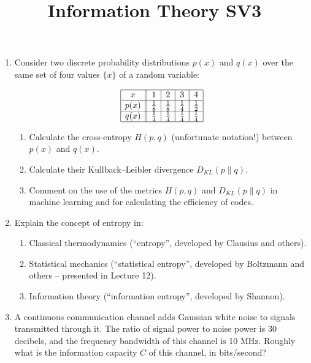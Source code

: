 \documentclass[11pt,a4paper]{article}
\title{Information Theory SV3}
\author{}
\date{}
\begin{document}
\maketitle


\begin{enumerate}
    \item Consider two discrete probability distributions $p(x)$ and $q(x)$ over the same set of four values $\{x\}$ of a random variable:

    \[
    \begin{array}{|c||c|c|c|c|}
    \hline
    x & 1 & 2 & 3 & 4 \\
    \hline
    p(x) & \tfrac{1}{8} & \tfrac{1}{8} & \tfrac{1}{4} & \tfrac{1}{2} \\ \hline
    q(x) & \tfrac{1}{4} & \tfrac{1}{4} & \tfrac{1}{4} & \tfrac{1}{4} \\ \hline
    \end{array}
    \]

    \begin{enumerate}
        \item Calculate the cross-entropy $H(p, q)$ (unfortunate notation!) between $p(x)$ and $q(x)$.
        \item Calculate their Kullback–Leibler divergence $D_{KL}(p \| q)$.
        \item Comment on the use of the metrics $H(p, q)$ and $D_{KL}(p \| q)$ in machine learning and for calculating the efficiency of codes.
    \end{enumerate}

    \item Explain the concept of entropy in:
    \begin{enumerate}
        \item Classical thermodynamics (“entropy”, developed by Clausius and others).
        \item Statistical mechanics (“statistical entropy”, developed by Boltzmann and others – presented in Lecture 12).
        \item Information theory (“information entropy”, developed by Shannon).
    \end{enumerate}

    \item A continuous communication channel adds Gaussian white noise to signals transmitted through it.  
    The ratio of signal power to noise power is 30 decibels, and the frequency bandwidth of this channel is 10 MHz.  
    Roughly what is the information capacity $C$ of this channel, in bits/second?


\end{enumerate}
\end{document}
